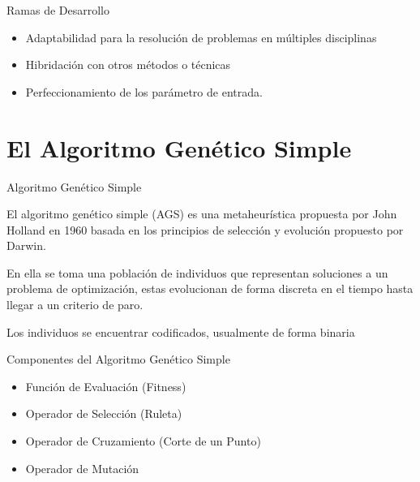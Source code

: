 \documentclass[10pt]{beamer}
\begin{document}
\begin{frame}{Ramas de Desarrollo}

	\begin{itemize}[<+- | alert@+>]
    
    	\item Adaptabilidad para la resolución de problemas en múltiples disciplinas
    	
    	\item Hibridación con otros métodos o técnicas
    	
    	\item Perfeccionamiento de los parámetro de entrada.
  
    \end{itemize}

\end{frame}

\section{El Algoritmo Genético Simple}


\begin{frame}{Algoritmo Genético Simple}

	El algoritmo genético simple (AGS) es una \alert{metaheurística} propuesta por
	John Holland en 1960 basada en los principios de selección y evolución
	propuesto por Darwin.
	
	En ella se toma una población de individuos que representan soluciones
	a un problema de optimización, estas \alert{evolucionan} de forma discreta en el tiempo
	hasta llegar a un criterio de paro.
	
	Los individuos se encuentrar codificados, usualmente de forma binaria
	
\end{frame}


\begin{frame}{Componentes del Algoritmo Genético Simple}

	\begin{itemize}[<+- | alert@+>]
    
    	\item Función de Evaluación (Fitness)
    	
    	\item Operador de Selección (Ruleta)
    	
    
    
    	\item Operador de Cruzamiento (Corte de un Punto)
    
    	\item Operador de Mutación
  
    \end{itemize}
    

\end{frame}
\end{document}
